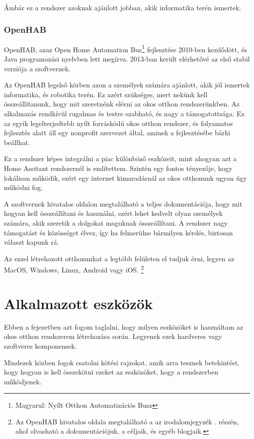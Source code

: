 \documentclass[
]{thesis-ekf}
\theoremstyle{definition}
\theoremstyle{remark}
\begin{document}
	Ámbár ez a rendszer azoknak ajánlott jobban, akik informatika terén ismertek.
	
	\subsection*{OpenHAB}
	
	OpenHAB, azaz Open Home Automation Bus\footnote{Magyarul: Nyílt Otthon Automatizációs Busz} fejlesztése 2010-ben kezdődött, és Java programozási nyelvben lett megírva. 2013-ban került elérhetővé az első stabil verziója a szoftvernek. 
	
	Az OpenHAB legelső körben azon a személyek számára ajánlott, akik jól ismertek informatika, és robotika terén. Ez azért szükséges, mert nekünk kell összeállítanunk, hogy mit szeretnénk elérni az okos otthon rendszerünkben. Az alkalmazás rendkívül rugalmas és testre szabható, és nagy a támogatottsága. Ez az egyik legelterjedtebb nyílt forráskódú okos otthon rendszer, és folyamatos fejlesztés alatt áll egy nonprofit szervezet által, aminek a fejlesztésébe bárki beállhat.
	
	Ez a rendszer képes integrálni a piac különböző eszközeit, mint ahogyan azt a Home Assitant rendszernél is említettem. Szintén egy fontos tényezője, hogy lokálisan működik, ezért egy internet kimaradásnál az okos otthonunk ugyan úgy működni fog. 
	
	A szoftvernek hivatalos oldalon megtalálható a teljes dokumentációja, hogy mit hogyan kell összeállítani és használni, ezért lehet kedvelt olyan személyek számára, akik szeretik a dolgokat maguknak összeállítani. A rendszer nagy támogatást és közösséget élvez, így ha felmerülne bármilyen kérdés, biztosan választ kapunk rá.
	
	Az ezzel létrehozott otthonunkat a legtöbb felületen el tudjuk érni, legyen az MacOS, Windows, Linux, Android vagy iOS.
	\footnote{Az OpenHAB hivatalos oldala megtalálható a az irodalomjegyzék \cite{openhab}. részén, ahol olvasható a dokumentációjuk, a céljaik, és egyéb blogjaik.}
	
	\chapter{Alkalmazott eszközök}
	
	Ebben a fejezetben azt fogom taglalni, hogy milyen eszközöket is használtam az okos otthon rendszerem létrehozása során. Legyenek ezek hardveres vagy szoftveres komponensek. 
	
	Mindezek közben fogok csatolni kötési rajzokat, amik arra tesznek betekintést, hogy hogyan is kell összekötni ezeket az eszközöket, hogy a rendszerben működjenek.
	
\end{document}

